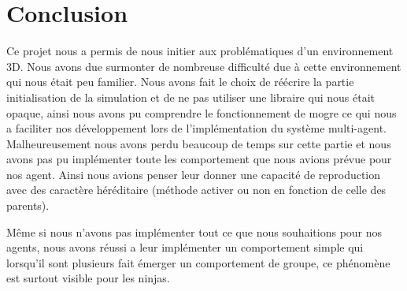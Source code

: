 \chapter{Conclusion}
\thispagestyle{fancy}
Ce projet nous a permis de nous initier aux problématiques d'un environnement 3D. Nous avons due surmonter de nombreuse difficulté due à cette environnement qui nous était peu familier. Nous avons fait le choix de réécrire la partie initialisation de la simulation et de ne pas utiliser une libraire qui nous était opaque, ainsi nous avons pu comprendre le fonctionnement de mogre ce qui nous a faciliter nos développement lors de l'implémentation du système multi-agent. Malheureusement nous avons perdu beaucoup de temps sur cette partie et nous avons pas pu implémenter toute les comportement que nous avions prévue pour nos agent. Ainsi nous avions penser leur donner une capacité de reproduction avec des caractère héréditaire (méthode activer ou non en fonction de celle des parents).

Même si nous n'avons pas implémenter tout ce que nous souhaitions pour nos agents, nous avons réussi a leur implémenter un comportement simple qui lorsqu'il sont plusieurs fait émerger un comportement de groupe, ce phénomène est surtout visible pour les ninjas.